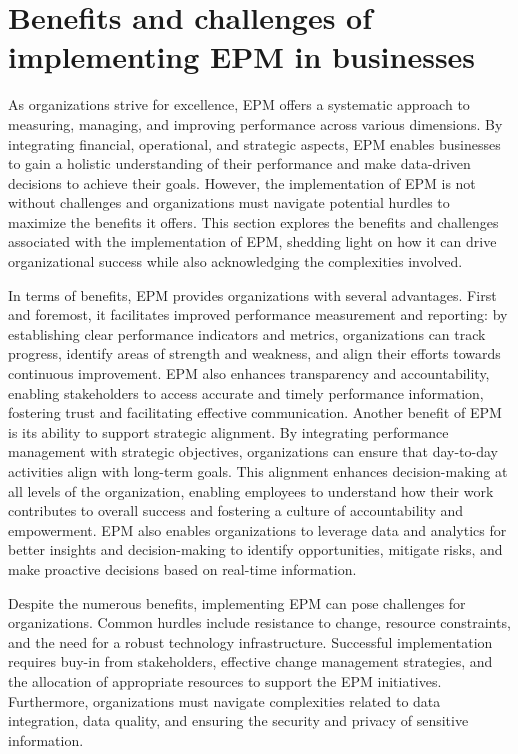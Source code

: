 \documentclass[12pt,a4paper,openright,twoside]{book}
\begin{document}
\section{Benefits and challenges of implementing EPM in businesses}

As organizations strive for excellence, EPM offers a systematic approach to measuring, managing, and improving performance across various dimensions. 
%
By integrating financial, operational, and strategic aspects, EPM enables businesses to gain a holistic understanding of their performance and make data-driven decisions to achieve their goals. 
%
However, the implementation of EPM is not without challenges and organizations must navigate potential hurdles to maximize the benefits it offers.
%
This section explores the benefits and challenges associated with the implementation of EPM, shedding light on how it can drive organizational success while also acknowledging the complexities involved.

In terms of benefits, EPM provides organizations with several advantages. 
%
First and foremost, it facilitates improved performance measurement and reporting: by establishing clear performance indicators and metrics, organizations can track progress, identify areas of strength and weakness, and align their efforts towards continuous improvement. 
%
EPM also enhances transparency and accountability, enabling stakeholders to access accurate and timely performance information, fostering trust and facilitating effective communication.
%
Another benefit of EPM is its ability to support strategic alignment. 
%
By integrating performance management with strategic objectives, organizations can ensure that day-to-day activities align with long-term goals. 
%
This alignment enhances decision-making at all levels of the organization, enabling employees to understand how their work contributes to overall success and fostering a culture of accountability and empowerment.
%
EPM also enables organizations to leverage data and analytics for better insights and decision-making to identify opportunities, mitigate risks, and make proactive decisions based on real-time information.

Despite the numerous benefits, implementing EPM can pose challenges for organizations. 
%
Common hurdles include resistance to change, resource constraints, and the need for a robust technology infrastructure. 
%
Successful implementation requires buy-in from stakeholders, effective change management strategies, and the allocation of appropriate resources to support the EPM initiatives. 
%
Furthermore, organizations must navigate complexities related to data integration, data quality, and ensuring the security and privacy of sensitive information.
\end{document}
